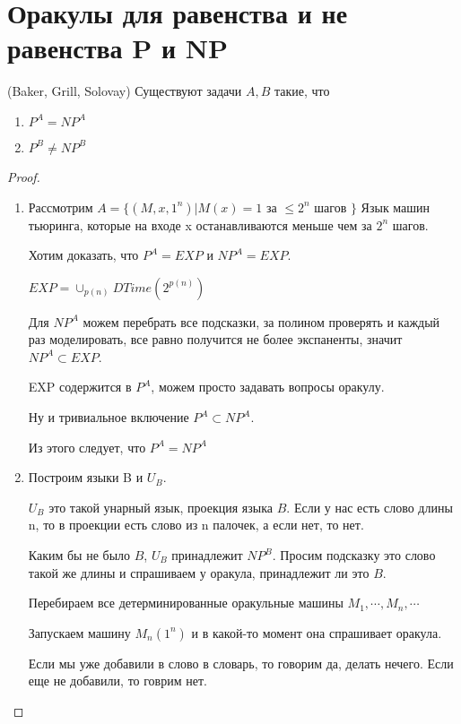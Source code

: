 ﻿\section{Оракулы для равенства и не равенства P и NP}
\begin{theorem} (Baker, Grill, Solovay)
	Существуют задачи $A, B$ такие, что
	\begin{enumerate}
	\item $P^{A} = NP^{A}$\\
	\item $P^{B} \ne NP^{B}$\\
	\end{enumerate}
\end{theorem}

\begin{proof}
\begin{enumerate}
\item 
	Рассмотрим $A = \{(M, x, 1^{n})| M(x) = 1 $ за $\le 2^n$ шагов $\}$
	Язык машин тьюринга, которые на входе x останавливаются меньше чем за $2^n$ шагов.

	Хотим доказать, что $P^A = EXP$ и $NP^A = EXP$.

	\begin{Def}
		$EXP = \cup_{p(n)}DTime(2^{p(n)})$
	\end{Def}

	Для $NP^{A}$ можем перебрать все подсказки, за полином проверять и каждый раз моделировать,
	все равно получится не более экспаненты, значит $NP^{A} \subset EXP$.

	EXP содержится в $P^A$, можем просто задавать вопросы оракулу. 

	Ну и тривиальное включение $P^A \subset NP^{A}$.

	Из этого следует, что $P^A = NP^{A}$\\
\item 
	Построим языки B и $U_B$.
	
	$U_{B}$ это такой унарный язык, проекция языка $B$. Если у нас есть слово длины n, 
	то в проекции есть слово из n палочек, а если нет, то нет.

	Каким бы не было $B$, $U_B$ принадлежит $NP^{B}$. Просим подсказку
	это слово такой же длины и спрашиваем у оракула, принадлежит ли это $B$.
	
	Перебираем все детерминированные оракульные машины $M_1, \cdots, M_n, \cdots $
	
	Запускаем машину $M_n(1^n)$ и в какой-то момент она спрашивает оракула. 
	
	Если мы уже добавили в слово в словарь, то говорим да, делать нечего. 
	Если еще не добавили, то говрим нет. 
	

\end{enumerate}
\end{proof}
